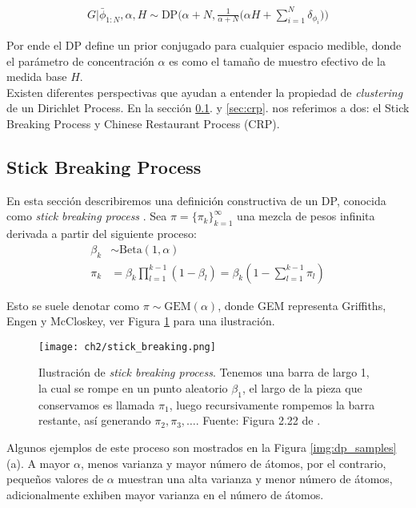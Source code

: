 \documentclass[letterpaper,12pt,oneside]{book} %
\begin{document}
\begin{align}
G|\bar{\phi}_{1:N}, \alpha, H \sim \text{DP}\bigg(\alpha+N, \frac{1}{\alpha+N}\bigg(\alpha H+\sum_{i=1}^{N}\delta_{\phi_{i}}\bigg)\bigg)
\end{align}

Por ende el DP define un prior conjugado para cualquier espacio medible, donde el parámetro de concentración $\alpha$ es como el tamaño de muestro efectivo de la medida base $H$.\\

Existen diferentes perspectivas que ayudan a entender la propiedad de \textit{clustering} de un Dirichlet Process. En la sección \ref{sec:sbp}. y \ref{sec:crp}. nos referimos a dos: el Stick Breaking Process y Chinese Restaurant Process (CRP).

\subsection{Stick Breaking Process}
\label{sec:sbp}

En esta sección describiremos una definición constructiva de un DP, conocida como \textit{stick breaking process} \citep{sethuraman1994constructive}. Sea $\pi=\{\pi_{k}\}_{k=1}^{\infty}$ una mezcla de pesos infinita derivada a partir del siguiente proceso:
\begin{align}
    \beta_{k} & \sim \text{Beta}(1, \alpha)\\
    \pi_{k} & = \beta_{k}\prod_{l=1}^{k-1}(1-\beta_{l}) = \beta_{k}(1-\sum_{l=1}^{k-1}\pi_{l})
\end{align}

Esto se suele denotar como $\pi \sim \text{GEM}(\alpha)$, donde GEM representa Griffiths, Engen y McCloskey, ver Figura  \ref{img:stick_breaking} para una ilustración. 

\begin{figure}
    \centering
    \texttt{[image: ch2/stick\_breaking.png]}
    \caption{Ilustración de \textit{stick breaking process}. Tenemos una barra de largo 1, la cual se rompe en un punto aleatorio $\beta_{1}$, el largo de la pieza que conservamos es llamada $\pi_{1}$, luego recursivamente rompemos la barra restante, así generando $\pi_{2}, \pi_{3}, \ldots$. Fuente: Figura 2.22 de \citep{sudderth2006graphical}.}
    \label{img:stick_breaking}
\end{figure}

Algunos ejemplos de este proceso son mostrados en la Figura \ref{img:dp_samples} (a). A mayor $\alpha$, menos varianza y mayor número de átomos, por el contrario, pequeños valores de $\alpha$ muestran una alta varianza y menor número de átomos, adicionalmente exhiben mayor varianza en el número de átomos.
\end{document}
